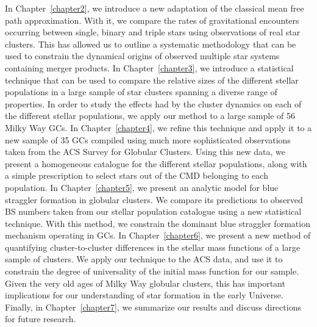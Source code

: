 In Chapter~\ref{chapter2}, we introduce a new adaptation of the
classical mean free path approximation.  With it, we compare the
rates of gravitational encounters occurring between single, binary and
triple stars using observations of real star clusters.  This has
allowed us to outline a systematic methodology that can be used to
constrain the dynamical origins of observed multiple star systems
containing merger products.  In Chapter~\ref{chapter3}, we
introduce a statistical technique that can be used to compare the
relative sizes of the different stellar populations in a large sample
of star clusters spanning a diverse range of properties.  In order to
study the effects had by the cluster dynamics on each of the different
stellar populations, we apply our 
method to a large sample of 56 Milky Way GCs.  In
Chapter~\ref{chapter4}, we refine this technique and apply it to a 
new sample of 35 GCs compiled using much more sophisticated
observations taken from the ACS Survey for Globular Clusters.  Using
this new data, we present a homogeneous catalogue
for the different stellar populations, along with a simple prescription to
select stars out of the CMD belonging to each population.  In
Chapter~\ref{chapter5}, we
present an analytic model for blue straggler formation in globular
clusters.  We compare its predictions to observed BS numbers taken
from our stellar population catalogue using a new
statistical technique.  With this method, we constrain the dominant
blue straggler formation mechanism operating in GCs.  In
Chapter~\ref{chapter6}, we present a new method of quantifying
cluster-to-cluster differences in the stellar mass functions of a
large sample of clusters.  We apply our technique to the ACS data,
and use it to constrain the degree of universality of the initial
mass function for our sample.  Given the very old ages of Milky Way globular
clusters, this has important implications for our understanding
of star formation in the early Universe.  
Finally, in Chapter~\ref{chapter7}, we summarize our results and
discuss directions for future research.     


 




